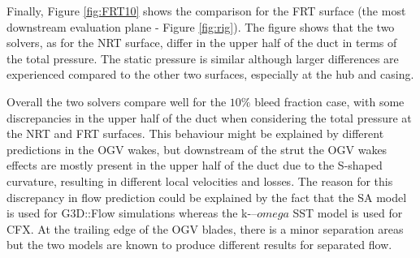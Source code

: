 Finally, Figure \ref{fig:FRT10} shows the comparison for the FRT surface (the most downstream evaluation plane - Figure \ref{fig:rig}). The figure shows that the two solvers, as for the NRT surface, differ in the upper half of the duct in terms of the total pressure. The static pressure is similar although larger differences are experienced compared to the other two surfaces, especially at the hub and casing.

Overall the two solvers compare well for the $10\%$ bleed fraction case, with some discrepancies in the upper half of the duct when considering the total pressure at the NRT and FRT surfaces. This behaviour might be explained by different predictions in the OGV wakes, but downstream of the strut the OGV wakes effects are mostly present in the upper half of the duct due to the S-shaped curvature, resulting in different local velocities and losses. The reason for this discrepancy in flow prediction could be explained by the fact that the SA model is used for G3D::Flow simulations whereas the k-$–omega$ SST model is used for CFX. At the trailing edge of the OGV blades, there is a minor separation areas but the two models are known to produce different results for separated flow.
